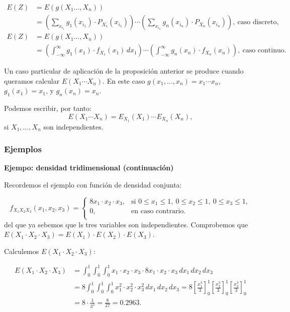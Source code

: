 \documentclass[
  letterpaper,
  DIV=11,
  numbers=noendperiod]{scrreprt}
\begin{document}
\[
\begin{array}{rl}
E(Z) & =E(g(X_1\ldots,X_n))\\ & =\left(\sum_{x_{i_1}} g_1(x_{i_1})\cdot P_{X_1}(x_{i_1})\right)\cdots \left(\sum_{x_{i_n}} g_n(x_{i_n})\cdot P_{X_n}(x_{i_n})\right), \ \mbox{caso discreto},\\
E(Z) & =E(g(X_1\ldots,X_n)) \\ & =\left(\int_{-\infty}^\infty g_1(x_1)\cdot f_{X_1}(x_1)\, dx_1\right)\cdots \left(\int_{-\infty}^\infty g_n(x_n)\cdot f_{X_n}(x_n)\right), \ \mbox{caso continuo}.
\end{array}
\]

Un caso particular de aplicación de la proposición anterior se produce
cuando queramos calcular \(E(X_1\cdots X_n)\). En este caso
\(g(x_1,\ldots,x_n)=x_1\cdots x_n\), \(g_1(x_1)=x_1\), y
\(g_n(x_n)=x_n\).

Podemos escribir, por tanto: \[
E(X_1\cdots X_n)=E_{X_1}(X_1)\cdots E_{X_n}(X_n),
\] si \(X_1,\ldots,X_n\) son independientes.

\hypertarget{ejemplos-14}{%
\subsubsection{Ejemplos}\label{ejemplos-14}}

\textbf{Ejempo: densidad tridimensional (continuación)}

Recordemos el ejemplo con función de densidad conjunta:

\[
f_{X_1X_2X_3}(x_1,x_2,x_3)=\begin{cases}
8 x_1\cdot x_2\cdot x_3, & \mbox{si }0\leq x_1\leq 1,\ 0\leq x_2\leq 1,\ 0\leq x_3\leq 1, \\
0, & \mbox{en caso contrario.}\\
\end{cases}
\] del que ya sebemos que ls tres variables son independientes.
Comprobemos que
\(E(X_1\cdot X_2\cdot X_3)=E(X_1)\cdot E(X_2)\cdot E(X_3)\).

Calculemos \(E(X_1\cdot X_2\cdot X_3)\):

\[
\begin{array}{rl}
E(X_1\cdot X_2\cdot X_3)  & = \int_0^1\int_0^1\int_0^1 x_1\cdot x_2\cdot x_3\cdot 8 x_1\cdot x_2\cdot x_3\,dx_1\, dx_2\, dx_3 \\ & = 8\int_0^1\int_0^1\int_0^1 x_1^2\cdot x_2^2\cdot x_3^2\,dx_1\, dx_2\, dx_3 =8\left[\frac{x_1^3}{3}\right]_0^1\left[\frac{x_2^3}{3}\right]_0^1
\left[\frac{x_3^3}{3}\right]_0^1 \\
& = 8\cdot \frac{1}{3^3}=\frac{8}{27}=0.2963.
\end{array}
\]
\end{document}
